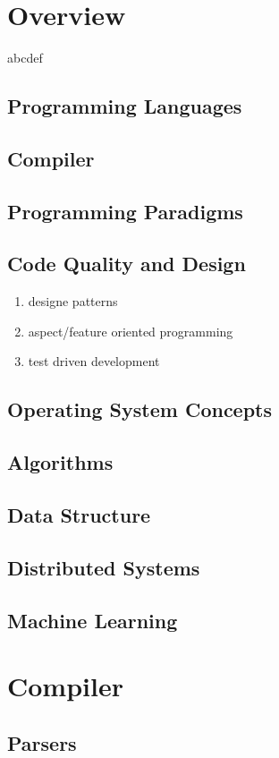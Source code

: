 \documentclass{article}
\begin{document}
\tableofcontents
\newpage

\section{Overview}
abcdef
\subsection{Programming Languages}
\subsection{Compiler}
\subsection{Programming Paradigms}
\subsection{Code Quality and Design}
\begin{enumerate}
    \item designe patterns
    \item aspect/feature oriented programming
    \item test driven development
\end{enumerate}
\subsection{Operating System Concepts}
\subsection{Algorithms}
\subsection{Data Structure}
\subsection{Distributed Systems}
\subsection{Machine Learning}

\section{Compiler}
\subsection{Parsers}
\end{document}
